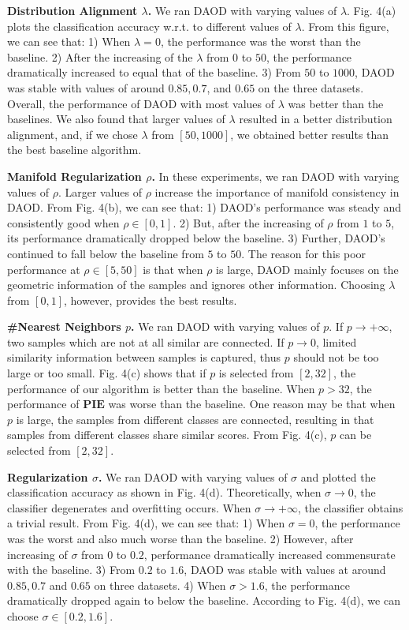 \documentclass[journal]{IEEEtran}
\begin{document}
 
 \textbf{{Distribution Alignment $\lambda$.}} We ran DAOD with varying
values of $\lambda$.  Fig. 4(a) plots the
classification accuracy w.r.t. to different values of $\lambda$. From this figure, we can see that: 1) When $\lambda=0$, the performance was the worst than the baseline. 2) After the increasing of the $\lambda$ from $0$ to $50$, the performance dramatically increased to equal that of the baseline. 3) From $50$ to $1000$, DAOD was stable with values of around $0.85, 0.7$, and $0.65$ on the three datasets. Overall, the performance of DAOD with most values of $\lambda$ was better than the baselines.  We also found that larger values of $\lambda$ resulted in a better distribution alignment, and, if we chose $\lambda$ from $[50,1000]$, we obtained better results than the best baseline algorithm.


\textbf{{Manifold Regularization $\rho$.}} In these experiments, we ran DAOD with varying values of $\rho$. Larger values of $\rho$ increase the importance of manifold consistency in DAOD.  From Fig. 4(b), we can see that: 1)  DAOD's performance was steady and consistently good when $\rho\in [0,1]$. 2) But, after the increasing of $\rho$ from $1$ to $5$,  its performance dramatically dropped below the baseline. 3) Further, DAOD's continued to fall below the baseline from $5$ to $50$.   The reason for this poor performance at $\rho\in [5,50]$ is that when $\rho$ is large, DAOD mainly focuses on the geometric information of the samples and ignores other information.  Choosing $\lambda$ from $[0,1]$, however, provides the best results. 



\textbf{{\#Nearest Neighbors $p$.}} We ran DAOD with varying values of $p$. If $p\to +\infty$, two samples which are not at all similar are connected. If $p\to 0$, limited similarity information between samples is captured, thus $p$ should not be too large or too small. Fig. 4(c) shows that if $p$ is selected from $[2,32]$, the performance of our algorithm is better than the baseline. When $p>32$, the performance of $\textbf{PIE}$ was worse than the baseline. One reason may be that when $p$ is large, the samples from different classes are connected, resulting in that samples from different classes share similar scores. From Fig. 4(c), $p$ can be selected from $[2,32]$.
 


\textbf{{Regularization $\sigma$.}} We ran DAOD with varying values of $\sigma$ and plotted the
classification accuracy as shown in Fig. 4(d). Theoretically, when $\sigma\to 0$, the classifier
degenerates and overfitting occurs. When $\sigma\to +\infty$, the classifier obtains a trivial result. From Fig. 4(d),  we  can  see  that: 1) When $\sigma=0$,  the  performance  was  the  worst  and  also  much worse than the baseline. 2) However, after increasing of $\sigma$ from $0$ to $0.2$, performance dramatically increased commensurate with the baseline. 3) From $0.2$ to $1.6$, DAOD was stable with values at around $0.85, 0.7$  and $0.65$ on  three  datasets. 4) When $\sigma>1.6$, the performance dramatically dropped again to below the baseline. According to Fig. 4(d), we can choose $\sigma\in[0.2,1.6]$.
\end{document}
